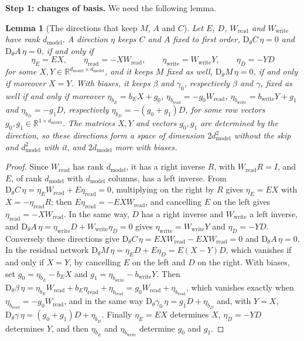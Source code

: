 \documentclass[10pt]{article}
\newtheorem{lemma}[theorem]{Lemma}
\theoremstyle{definition}
\theoremstyle{remark}
\newcommand{\R}{\mathbb{R}}
\newcommand{\Wread}{W_{\mathrm{read}}}
\newcommand{\Wwrite}{W_{\mathrm{write}}}
\newcommand{\dm}{d_{\mathrm{model}}}
\newcommand{\Der}{\mathrm{D}}
\newcommand{\para}[1]{\smallskip\noindent\textbf{#1}\hspace{0.5em}}
\newenvironment{nested}{\par\nopagebreak\def\FrameCommand{\hspace{0.5em}{\color{black!30}\vrule width 0.6pt}\hspace{1em}}\MakeFramed{\advance\hsize-\width\FrameRestore}}{\endMakeFramed}
\begin{document}
\para{Step 1: changes of basis.} We need the following lemma.
\begin{nested}
\begin{lemma}[The directions that keep $M$, $A$ and $C$]\label{lem:fact}
Let $E$, $D$, $\Wread$ and $\Wwrite$ have rank $\dm$. A direction $\eta$ keeps $C$ and $A$ fixed to first order, $\Der_\theta C\,\eta = 0$ and $\Der_\theta A\,\eta = 0$, if and only if
\[
\eta_E = EX,\qquad \eta_{\mathrm{read}} = -X\Wread,\qquad \eta_{\mathrm{write}} = \Wwrite Y,\qquad \eta_D = -YD
\]
for some $X, Y \in \R^{\dm\times\dm}$, and it keeps $M$ fixed as well, $\Der_\theta M\,\eta = 0$, if and only if moreover $X = Y$. With biases, it keeps $\beta$ and $\gamma_0$, respectively $\beta$ and $\gamma$, fixed as well if and only if moreover $\eta_{b_E} = b_EX + g_0$, $\eta_{b_{\mathrm{read}}} = -g_0\Wread$, $\eta_{b_{\mathrm{write}}} = b_{\mathrm{write}}Y + g_1$ and $\eta_{b_D} = -g_1D$, respectively $\eta_{b_D} = -(g_0 + g_1)D$, for some row vectors $g_0, g_1 \in \R^{1\times\dm}$. The matrices $X, Y$ and vectors $g_0, g_1$ are determined by the direction, so these directions form a space of dimension $2\dm^2$ without the skip and $\dm^2$ with it, and $2\dm$ more with biases.
\end{lemma}

\begin{proof}
Since $\Wread$ has rank $\dm$, it has a right inverse $R$, with $\Wread R = I$, and $E$, of rank $\dm$ with $\dm$ columns, has a left inverse. From $\Der_\theta C\,\eta = \eta_E\Wread + E\eta_{\mathrm{read}} = 0$, multiplying on the right by $R$ gives $\eta_E = EX$ with $X = -\eta_{\mathrm{read}}R$; then $E\eta_{\mathrm{read}} = -EX\Wread$, and cancelling $E$ on the left gives $\eta_{\mathrm{read}} = -X\Wread$. In the same way, $D$ has a right inverse and $\Wwrite$ a left inverse, and $\Der_\theta A\,\eta = \eta_{\mathrm{write}}D + \Wwrite\eta_D = 0$ gives $\eta_{\mathrm{write}} = \Wwrite Y$ and $\eta_D = -YD$. Conversely these directions give $\Der_\theta C\,\eta = EX\Wread - EX\Wread = 0$ and $\Der_\theta A\,\eta = 0$. In the residual network $\Der_\theta M\,\eta = \eta_ED + E\eta_D = E(X - Y)D$, which vanishes if and only if $X = Y$, by cancelling $E$ on the left and $D$ on the right. With biases, set $g_0 = \eta_{b_E} - b_EX$ and $g_1 = \eta_{b_{\mathrm{write}}} - b_{\mathrm{write}}Y$. Then $\Der_\theta\beta\,\eta = \eta_{b_E}\Wread + b_E\eta_{\mathrm{read}} + \eta_{b_{\mathrm{read}}} = g_0\Wread + \eta_{b_{\mathrm{read}}}$, which vanishes exactly when $\eta_{b_{\mathrm{read}}} = -g_0\Wread$, and in the same way $\Der_\theta\gamma_0\,\eta = g_1D + \eta_{b_D}$ and, with $Y = X$, $\Der_\theta\gamma\,\eta = (g_0 + g_1)D + \eta_{b_D}$. Finally $\eta_E = EX$ determines $X$, $\eta_D = -YD$ determines $Y$, and then $\eta_{b_E}$ and $\eta_{b_{\mathrm{write}}}$ determine $g_0$ and $g_1$.
\end{proof}
\end{nested}
\end{document}
